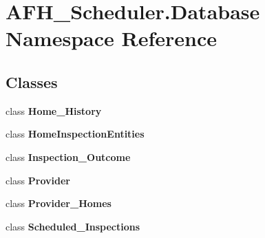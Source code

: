 \section{A\+F\+H\+\_\+\+Scheduler.\+Database Namespace Reference}
\label{namespace_a_f_h___scheduler_1_1_database}
\subsection*{Classes}
\begin{DoxyCompactItemize}
\item 
class \textbf{ Home\+\_\+\+History}
\item 
class \textbf{ Home\+Inspection\+Entities}
\item 
class \textbf{ Inspection\+\_\+\+Outcome}
\item 
class \textbf{ Provider}
\item 
class \textbf{ Provider\+\_\+\+Homes}
\item 
class \textbf{ Scheduled\+\_\+\+Inspections}
\end{DoxyCompactItemize}
